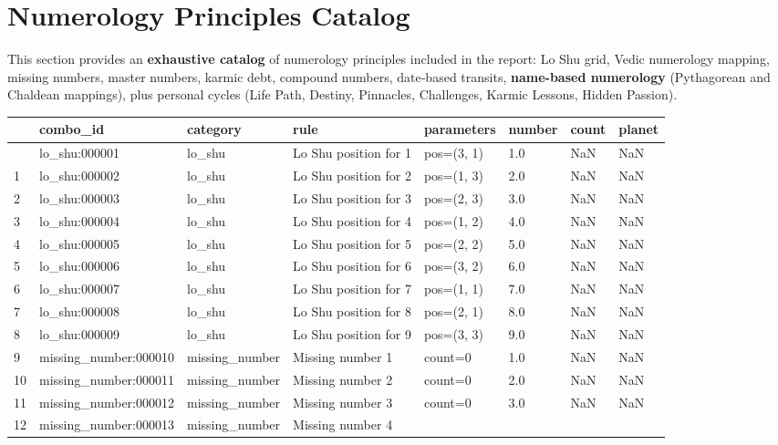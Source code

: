 \documentclass[
  11pt,
  a4paper,
  oneside,
  openany]{report}
\begin{document}
\chapter{Numerology Principles
Catalog}\label{numerology-principles-catalog}

This section provides an \textbf{exhaustive catalog} of numerology
principles included in the report: Lo Shu grid, Vedic numerology
mapping, missing numbers, master numbers, karmic debt, compound numbers,
date‑based transits, \textbf{name-based numerology} (Pythagorean and
Chaldean mappings), plus personal cycles (Life Path, Destiny, Pinnacles,
Challenges, Karmic Lessons, Hidden Passion).

\label{num-catalog}
\begin{longtable}[]{@{}llllllll@{}}
\toprule\noalign{}
& combo\_id & category & rule & parameters & number & count & planet \\
\midrule\noalign{}
\endhead
\bottomrule\noalign{}
\endlastfoot
0 & lo\_shu:000001 & lo\_shu & Lo Shu position for 1 & pos=(3, 1) & 1.0
& NaN & NaN \\
1 & lo\_shu:000002 & lo\_shu & Lo Shu position for 2 & pos=(1, 3) & 2.0
& NaN & NaN \\
2 & lo\_shu:000003 & lo\_shu & Lo Shu position for 3 & pos=(2, 3) & 3.0
& NaN & NaN \\
3 & lo\_shu:000004 & lo\_shu & Lo Shu position for 4 & pos=(1, 2) & 4.0
& NaN & NaN \\
4 & lo\_shu:000005 & lo\_shu & Lo Shu position for 5 & pos=(2, 2) & 5.0
& NaN & NaN \\
5 & lo\_shu:000006 & lo\_shu & Lo Shu position for 6 & pos=(3, 2) & 6.0
& NaN & NaN \\
6 & lo\_shu:000007 & lo\_shu & Lo Shu position for 7 & pos=(1, 1) & 7.0
& NaN & NaN \\
7 & lo\_shu:000008 & lo\_shu & Lo Shu position for 8 & pos=(2, 1) & 8.0
& NaN & NaN \\
8 & lo\_shu:000009 & lo\_shu & Lo Shu position for 9 & pos=(3, 3) & 9.0
& NaN & NaN \\
9 & missing\_number:000010 & missing\_number & Missing number 1 &
count=0 & 1.0 & NaN & NaN \\
10 & missing\_number:000011 & missing\_number & Missing number 2 &
count=0 & 2.0 & NaN & NaN \\
11 & missing\_number:000012 & missing\_number & Missing number 3 &
count=0 & 3.0 & NaN & NaN \\
12 & missing\_number:000013 & missing\_number & Missing number 4 &

\end{longtable}
\end{document}
